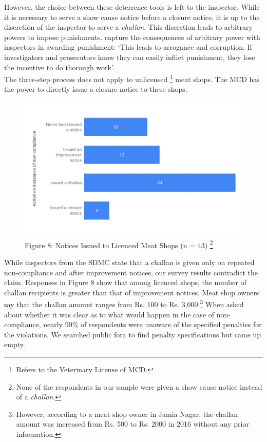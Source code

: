 \documentclass[a4paper, 12pt]{article}
\begin{document}
However, the choice between these deterrence tools is left to the inspector. While it is necessary to serve a show cause notice before a closure notice, it is up to the discretion of the inspector to serve a \textit{challan}. This discretion leads to arbitrary powers to impose punishments. \parencite{roychapter} capture the consequences of arbitrary power with inspectors in awarding punishment: ‘This leads to arrogance and corruption. If investigators and prosecutors know they can easily inflict punishment, they lose the incentive to do thorough work’.\\

The three-step process does not apply to unlicensed \footnote{ Refers to the Veterinary License of MCD.} meat shops. The MCD has the power to directly issue a closure notice to these shops.\\

\begin{figure}[H]
\centering
\includegraphics{Fig 8.jpg}
\caption[Optional Caption]{Figure 8: Notices Issued to Licenced Meat Shops (n = 43) \footnote{None of the respondents in our sample were given a show cause notice instead of a \textit{challan}.}}
\end{figure}

While inspectors from the SDMC state that a challan is given only on repeated non-compliance and after improvement notices, our survey results contradict the claim. Responses in Figure 8 show that among licenced shops, the number of challan recipients is greater than that of improvement notices. Meat shop owners say that the challan amount ranges from Rs. 100 to Rs. 3,000.\footnote{However, according to a meat shop owner in Jamia Nagar, the challan amount was increased from Rs. 500 to Rs. 2000 in 2016 without any prior information.} When asked about whether it was clear as to what would happen in the case of non-compliance, nearly 90\% of respondents were unaware of the specified penalties for the violations. We searched public fora to find penalty specifications but came up empty.\\
\end{document}
